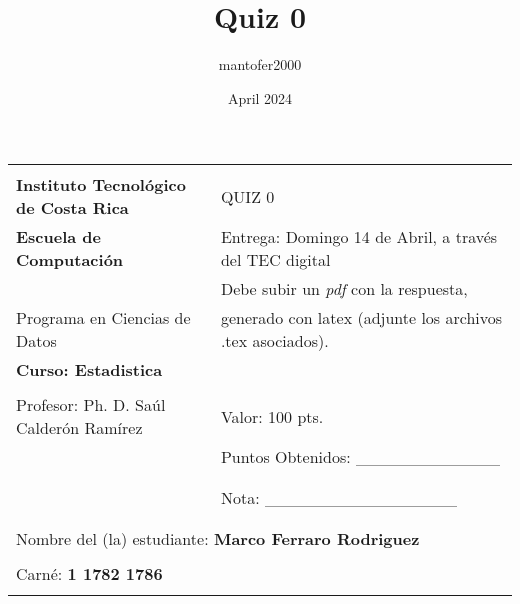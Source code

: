 \documentclass{article}
\title{Quiz 0}
\author{mantofer2000}
\date{April 2024}
\begin{document}
\begin{flushleft}
\begin{tabular}{|l|l|}
\hline 
 & \tabularnewline
\textbf{\large{}Instituto Tecnológico de Costa Rica} & QUIZ 0\tabularnewline
\textbf{\large{}Escuela de Computación} & Entrega: Domingo 14 de Abril, a través del TEC digital\tabularnewline
 & Debe subir un \emph{pdf }con la respuesta,\tabularnewline
Programa en Ciencias de Datos & generado con latex (adjunte los archivos .tex asociados).\tabularnewline
\textbf{Curso: Estadistica} & \tabularnewline
 & \tabularnewline
Profesor: Ph. D. Saúl Calderón Ramírez & Valor: 100 pts.\tabularnewline
 & Puntos Obtenidos: \_\_\_\_\_\_\_\_\_\_\_\_\tabularnewline
 & \tabularnewline
 & \tabularnewline
 & Nota: \_\_\_\_\_\_\_\_\_\_\_\_\_\_\_\_\tabularnewline
 & \tabularnewline
\cline{2-2} 
\multicolumn{2}{|c|}{}\tabularnewline
\multicolumn{2}{|l|}{Nombre del (la) estudiante: \textbf{Marco Ferraro Rodriguez}}\tabularnewline
\multicolumn{1}{|l}{} & \tabularnewline
\multicolumn{1}{|l}{Carné: \textbf{1 1782 1786}} & \tabularnewline
\multicolumn{1}{|l}{} & \tabularnewline
\hline 
\end{tabular}
\par\end{flushleft}
\end{document}
